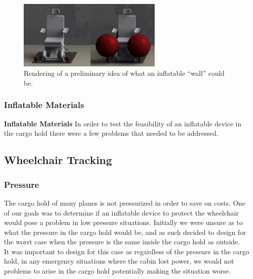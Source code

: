 \begin{figure}[h]
  \centering
     \includegraphics[width=7cm]{images/inflatablesrendering.png}
   \caption{Rendering of a preliminary idea of what an inflatable ``wall'' could be.}
  \label{fig:inflatablesrendering.png}
\end{figure}












\subsubsection{Inflatable Materials}

\textbf{Inflatable Materials}
In order to test the feasibility of an inflatable device in the cargo hold there were a few problems that needed to be addressed. 

\subsection{Wheelchair Tracking}

\subsubsection{Pressure}
The cargo hold of many planes is not pressurized in order to save on costs. One of our goals was to determine if an inflatable device to protect the wheelchair would pose a problem in low pressure situations. Initially we were unsure as to what the pressure in the cargo hold would be, and as such decided to design for the worst case when the pressure is the same inside the cargo hold as outside. \\

It was important to design for this case as regardless of the pressure in the cargo hold, in any emergency situations where the cabin lost power, we would not problems to arise in the cargo hold potentially making the situation worse.

